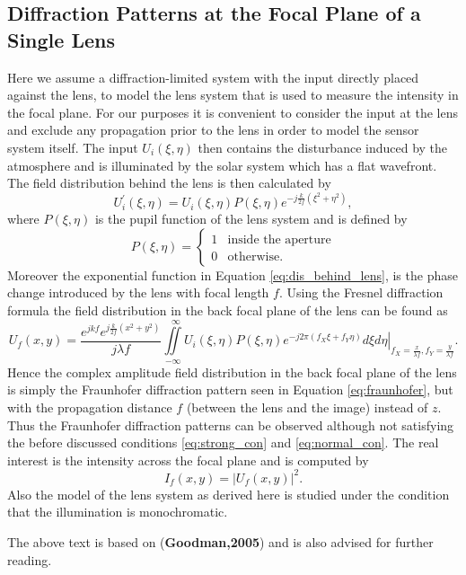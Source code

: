 \subsection{Diffraction Patterns at the Focal Plane of a Single Lens}
Here we assume a diffraction-limited system with the input directly placed against the lens, to model the lens system that is used to measure the intensity in the focal plane. For our purposes it is convenient to consider the input at the lens and exclude any propagation prior to the lens in order to model the sensor system itself.  The input $U_i(\xi,\eta)$ then contains the disturbance induced by the atmosphere and is illuminated by the solar system which has a flat wavefront. The field distribution behind the lens is then calculated by
\begin{equation}
U^\prime_i(\xi,\eta)=U_i(\xi,\eta)P(\xi,\eta)e^{-j\frac{k}{2f}(\xi^2 + \eta^2)},
\label{eq:dis_behind_lens}
\end{equation}
where $P(\xi,\eta)$ is the pupil function of the lens system and is defined by
\begin{equation}
P(\xi,\eta)= \begin{cases} 1 & \text{inside the aperture} \\ 0 & \text{otherwise.} \end{cases}
\label{PupilFunction}
\end{equation}
Moreover the exponential function in Equation \eqref{eq:dis_behind_lens}, is the phase change introduced by the lens with focal length $f$. Using the Fresnel diffraction formula the field distribution in the back focal plane of the lens can be found as
\begin{equation}
U_f(x,y)=\frac{e^{jkf}e^{j\frac{k}{2f}(x^2+y^2)}}{j\lambda f}\iint\limits_{-\infty}^{~~~\infty} \left. U_i(\xi,\eta)P(\xi,\eta)e^{-j2\pi(f_X\xi+f_Y\eta)}d\xi d\eta \right|_{f_X=\frac{x}{\lambda f},f_Y=\frac{y}{\lambda f}}.
\label{eq:fresnel}
\end{equation}
Hence the complex amplitude field distribution in the back focal plane of the lens is simply the Fraunhofer diffraction pattern seen in Equation \eqref{eq:fraunhofer}, but with the propagation distance $f$ (between the lens and the image) instead of $z$. Thus the Fraunhofer diffraction patterns can be observed although not satisfying the before discussed conditions \eqref{eq:strong_con} and \eqref{eq:normal_con}. The real interest is the intensity across the focal plane and is computed by
\begin{equation}
I_f(x,y)=|U_f(x,y)|^2.
\end{equation}
Also the model of the lens system as derived here is studied under the condition that the illumination is monochromatic. 


The above text is based on (\textbf{Goodman,2005}) and is also advised for further reading.